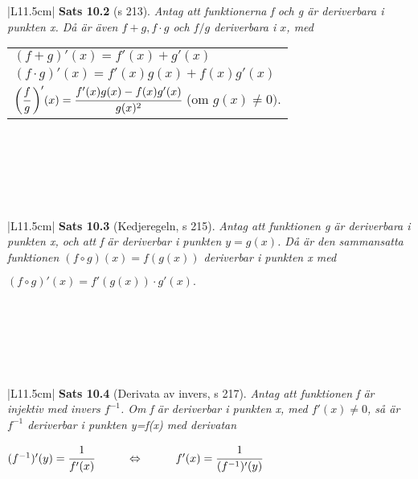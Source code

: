 \documentclass[a4paper]{article}
\begin{document}
\begin{tabular}{|L{11.5cm}|} \hline
\textbf{Sats 10.2} (s 213).
\textit{Antag att funktionerna f och g är deriverbara i punkten x. Då är även $f+g, f\cdot g$ och $f/g$ deriverbara i $x$, med}
\begin{center}
\begin{tabular}{l}
\vspace{0.2cm}
$(f+g)'(x) = f'(x) + g'(x)$ \\ \vspace{0.2cm}
$(f\cdot g)'(x) = f'(x)g(x) + f(x)g'(x)$ \\
$\bigg( \cfrac{f}{g}\hspace{2pt} \bigg) '(x) = \cfrac{f'(x)g(x) - f(x)g'(x)}{g(x)^2}$ \hspace{1cm}(om $g(x)\neq 0).$
\end{tabular}
\end{center}
\\\hline
\end{tabular}
\\\\\\
\begin{tabular}{|L{11.5cm}|} \hline
\textbf{Sats 10.3} (Kedjeregeln, s 215).
\textit{Antag att funktionen g är deriverbara i punkten x, och att f är deriverbar i punkten $y=g(x)$. Då är den sammansatta funktionen $(f\circ g)(x)=f(g(x))$ deriverbar i punkten x med}
\begin{center}
$(f\circ g)'(x)=f'(g(x))\cdot g'(x).$ 
\end{center}
\\\hline
\end{tabular}
\\\\\\
\begin{tabular}{|L{11.5cm}|} \hline
\textbf{Sats 10.4} (Derivata av invers, s 217).
\textit{Antag att funktionen f är injektiv med invers $f^{-1}$. Om f är deriverbar i punkten x, med $f'(x)\neq 0$, så är $f^{-1}$ deriverbar i punkten y=f(x) med derivatan}
\begin{center}
$(f^{-1})'(y)=\cfrac{1}{f'(x)} \hspace{1cm} \Leftrightarrow \hspace{1cm} f'(x)=\cfrac{1}{(f^{-1})'(y)}$
\end{center}
\\\hline
\end{tabular}
\\\\\\
\end{document}
